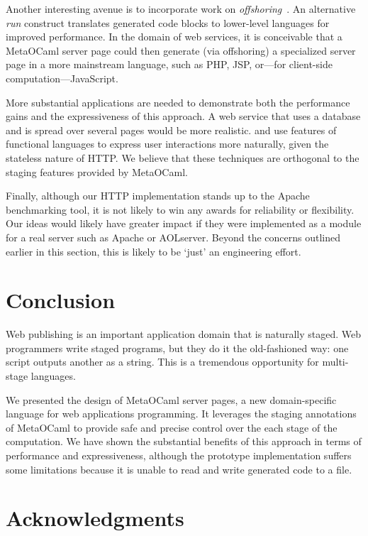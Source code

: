 \documentclass{elsart}
\def\MOC{MetaOCaml\xspace}
\begin{document}
Another interesting avenue is to incorporate work on
\emph{offshoring}~\cite{eckhardt04offshoring}.  An alternative
\emph{run} construct translates generated code blocks to lower-level
languages for improved performance.  In the domain of web services, it
is conceivable that a \MOC server page could then generate (via
offshoring) a specialized server page in a more mainstream language,
such as PHP, JSP, or---for client-side computation---JavaScript.

More substantial applications are needed to demonstrate both the
performance gains and the expressiveness of this approach.  A web
service that uses a database and is spread over several pages would be
more realistic.  \citet{queinnec00influence} and
\citet{graunke01programming} use features of functional languages to
express user interactions more naturally, given the stateless nature
of HTTP.  We believe that these techniques are orthogonal to the
staging features provided by \MOC.

Finally, although our HTTP implementation stands up to the Apache
benchmarking tool, it is not likely to win any awards for reliability
or flexibility.  Our ideas would likely have greater impact if they
were implemented as a module for a real server such as Apache or
AOLserver.  Beyond the concerns outlined earlier in this section, this
is likely to be `just' an engineering effort.


\section{Conclusion}
\label{sec:concl}

Web publishing is an important application domain that is naturally
staged.  Web programmers write staged programs, but they do it the
old-fashioned way: one script outputs another as a string.  This is a
tremendous opportunity for multi-stage languages.

We presented the design of \MOC server pages, a new
domain-specific language for web applications programming.  It
leverages the staging annotations of \MOC to provide safe and
precise control over the each stage of the computation.
We have shown the substantial benefits of this approach in terms
of performance and expressiveness, although the prototype
implementation suffers some limitations because it is unable to
read and write generated code to a file.

\section*{Acknowledgments}
\end{document}
